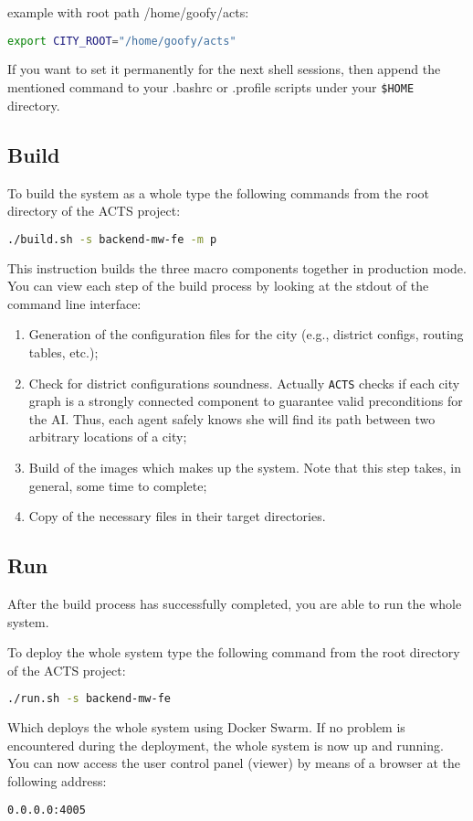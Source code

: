 example with root path /home/goofy/acts:
\begin{lstlisting}[language=bash]
export CITY_ROOT="/home/goofy/acts"
\end{lstlisting}

If you want to set it permanently for the next shell sessions,
then append the mentioned command
to your .bashrc or .profile scripts under your
\texttt{\$HOME} directory.

\subsection{Build}\label{sec:sys-build}

To build the system as a whole type the following commands from the root
directory of the ACTS project:

\begin{lstlisting}[language=bash]
./build.sh -s backend-mw-fe -m p
\end{lstlisting}

This instruction builds the three macro components together in production mode.
You can view each step of the build process by looking at the stdout of the
command line interface:

\begin{enumerate}
\item Generation of the configuration files for the city (e.g., district
  configs, routing tables, etc.);
\item Check for district configurations soundness. Actually \texttt{ACTS}
  checks if each city graph is a strongly connected component to guarantee
  valid preconditions for the AI. Thus, each agent safely knows she will
  find its path between two arbitrary locations of a city;
\item Build of the images which makes up the system. Note that this step
  takes, in general, some time to complete;
\item Copy of the necessary files in their target directories.
\end{enumerate}

\subsection{Run}\label{sec:sys-run}

After the build process has successfully completed, you are able to
run the whole system.

To deploy the whole system type the following command from the root directory
of the ACTS project:

\begin{lstlisting}[language=bash]
./run.sh -s backend-mw-fe
\end{lstlisting}

Which deploys the whole system using Docker Swarm.
If no problem is encountered during the deployment, the whole system is now up
and running.
You can now access the user control panel (viewer) by means of a browser at the
following address:

\begin{lstlisting}[language=bash]
0.0.0.0:4005
\end{lstlisting}
